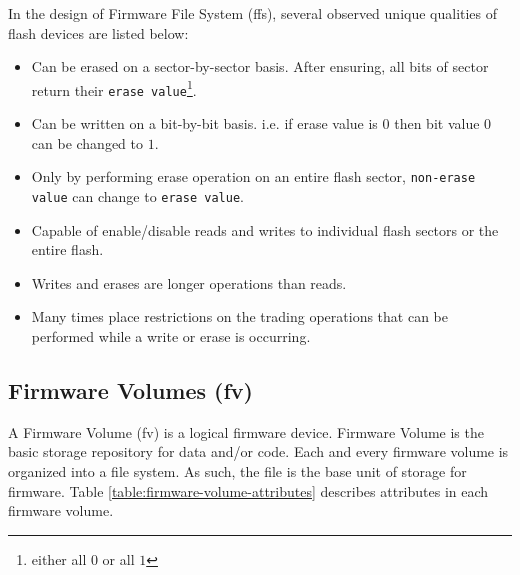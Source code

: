 In the design of Firmware File System (\gls{ffs}), several observed unique qualities of flash devices are listed below:
\begin{itemize}
	\item Can be erased on a sector-by-sector basis. After ensuring, all bits of sector return their \verb|erase value|\footnote{either all $0$ or all $1$}.
	\item Can be written on a bit-by-bit basis. i.e. if erase value is $ 0 $ then bit value $ 0 $ can be changed to $ 1 $.
	\item Only by performing erase operation on an entire flash sector, \verb|non-erase value| can change to \verb|erase value|.
	\item Capable of enable/disable reads and writes to individual flash sectors or the entire flash.
	\item Writes and erases are longer operations than reads.
	\item Many times place restrictions on the trading operations that can be performed while a write or erase is occurring.
\end{itemize}

\subsection{Firmware Volumes (\gls{fv})}
A Firmware Volume (\gls{fv}) is a logical firmware device. Firmware Volume is the basic storage repository for data and/or code. Each and every firmware volume is organized into a file system. As such, the file is the base unit of storage for firmware.
Table \ref{table:firmware-volume-attributes} describes attributes in each firmware volume.

